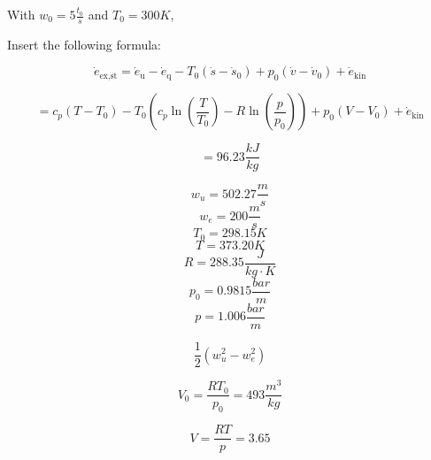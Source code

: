 With \( w_0 = 5 \frac{t_0}{s} \) and \( T_0 = 300K \),

Insert the following formula:

\[
\dot{e}_{\text{ex,st}} = \dot{e}_{\text{u}} - \dot{e}_{\text{q}} - T_0 (\dot{s} - \dot{s}_0) + p_0 (\dot{v} - \dot{v}_0) + \dot{e}_{\text{kin}}
\]

\[
= c_p (T - T_0) - T_0 \left( c_p \ln \left( \frac{T}{T_0} \right) - R \ln \left( \frac{p}{p_0} \right) \right) + p_0 (V - V_0) + \dot{e}_{\text{kin}}
\]

\[
= \boxed{96.23 \frac{kJ}{kg}}
\]

\[
w_u = 502.27 \frac{m}{s}
\]
\[
w_e = 200 \frac{m}{s}
\]
\[
T_0 = 298.15 K
\]
\[
T = 373.20 K
\]
\[
R = 288.35 \frac{J}{kg \cdot K}
\]
\[
p_0 = 0.9815 \frac{bar}{m}
\]
\[
p = 1.006 \frac{bar}{m}
\]

\[
\frac{1}{2} (w_u^2 - w_e^2)
\]

\[
V_0 = \frac{RT_0}{p_0} = 493 \frac{m^3}{kg}
\]

\[
V = \frac{RT}{p} = 3.65
\]